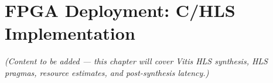 \chapter{FPGA Deployment: C/HLS Implementation}

\textit{(Content to be added — this chapter will cover Vitis HLS synthesis, HLS pragmas, resource estimates, and post-synthesis latency.)}
